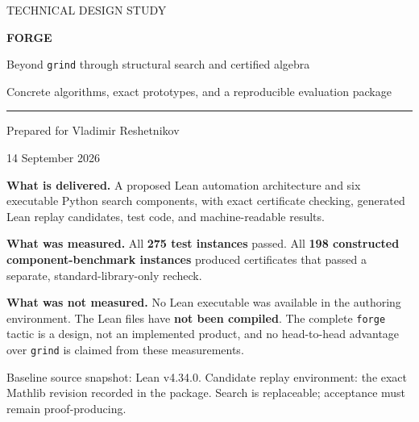 \documentclass[11pt,a4paper]{article}
\theoremstyle{definition}
\newcommand{\grind}{\texttt{grind}}
\newcommand{\code}[1]{\texttt{#1}}
\begin{document}
\begin{titlepage}
\vspace*{14mm}
{\color{accent}\large TECHNICAL DESIGN STUDY\par}
\vspace{12mm}
{\color{ink}\Huge\bfseries FORGE\par}
\vspace{5mm}
{\color{ink}\LARGE Beyond \texttt{grind} through structural search and certified algebra\par}
\vspace{9mm}
{\large Concrete algorithms, exact prototypes, and a reproducible evaluation package\par}
\vspace{13mm}
\noindent\rule{\textwidth}{0.8pt}
\vspace{5mm}
{\large Prepared for Vladimir Reshetnikov\par}
{14 September 2026\par}
\vspace{12mm}
\begin{minipage}{0.94\textwidth}
\textbf{What is delivered.} A proposed Lean automation architecture and six executable Python search components, with exact certificate checking, generated Lean replay candidates, test code, and machine-readable results.

\textbf{What was measured.} All \textbf{275 test instances} passed. All \textbf{198 constructed component-benchmark instances} produced certificates that passed a separate, standard-library-only recheck.

\textbf{What was not measured.} No Lean executable was available in the authoring environment. The Lean files have \textbf{not been compiled}. The complete \code{forge} tactic is a design, not an implemented product, and no head-to-head advantage over \grind{} is claimed from these measurements.
\end{minipage}
\vfill
{\small\color{muted}Baseline source snapshot: Lean v4.34.0. Candidate replay environment: the exact Mathlib revision recorded in the package. Search is replaceable; acceptance must remain proof-producing.}
\end{titlepage}
\end{document}
